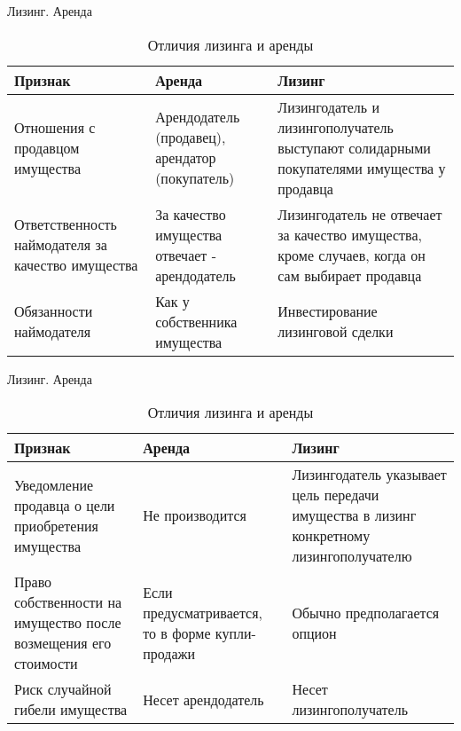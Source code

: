 \documentclass[_Banking_p3.tex]{subfiles}
\begin{document}
\begin{frame}[shrink=25]{Лизинг. Аренда}
\begin{table}[htbp]
  \centering
  \caption{Отличия лизинга и аренды}
	\begin{tabularx}{\linewidth}[b]{@{}>{\raggedright\arraybackslash}XXX@{}}
    \toprule
    Признак & Аренда & Лизинг \\
    \midrule
    Отношения с продавцом имущества & Арендодатель (продавец), арендатор (покупатель) & Лизингодатель и лизингополучатель выступают солидарными покупателями имущества у продавца \\
    Ответственность наймодателя за качество имущества & За качество имущества отвечает - арендодатель & Лизингодатель не отвечает за качество имущества, кроме случаев, когда он сам выбирает продавца \\
    Обязанности наймодателя & Как у собственника имущества & Инвестирование лизинговой сделки \\
    \bottomrule
    \end{tabularx}%
  \label{tab:addlabel}%
\end{table}%
\end{frame}


\begin{frame}[shrink=25]{Лизинг. Аренда}
\begin{table}[htbp]
  \centering
  \caption{Отличия лизинга и аренды}
	\begin{tabularx}{\linewidth}[b]{@{}>{\raggedright\arraybackslash}XXX@{}}
    \toprule
    Признак & Аренда & Лизинг \\
    \midrule
    Уведомление продавца о цели приобретения имущества & Не производится & Лизингодатель указывает цель передачи имущества в лизинг конкретному лизингополучателю \\
    Право собственности на имущество после возмещения его стоимости & Если предусматривается,  то в форме купли-продажи & Обычно предполагается опцион \\
    Риск случайной гибели имущества & Несет арендодатель & Несет лизингополучатель \\
    \bottomrule
    \end{tabularx}%
  \label{tab:addlabel}%
\end{table}%
\end{frame}
\end{document}
